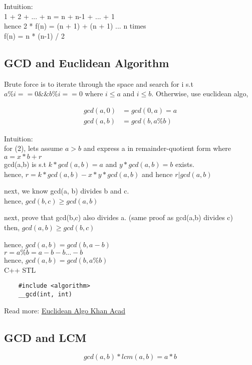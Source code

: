 \documentclass[12pt]{article}
\begin{document}
Intuition: \\ 

1 + 2 + ... + n = n + n-1 + ... + 1 \\
hence 2 * f(n) = (n + 1) + (n + 1) ... n times \\ 
f(n) = n * (n-1) / 2 

\subsection{GCD and Euclidean Algorithm} 

Brute force is to iterate through the space and search for i s.t \(a \% i == 0 \&\& b \% i == 0\) where \(i \leq a\) and \(i \leq b\). Otherwise, use euclidean algo, 

\begin{align}  
	gcd(a, 0) &= gcd(0, a) = a \tag{base case} \\
	gcd(a, b) &= gcd(b, a \% b) \tag{recursive case}
\end{align}

Intuition: \\

for (2), lets assume \(a > b\) and express a in remainder-quotient form where \(a = x * b + r \) \\ 
gcd(a,b) is s.t \(k * gcd(a, b) = a\) and \(y * gcd(a,b) = b\) exists. \\
hence, \(r = k * gcd(a, b) - x* y * gcd(a, b)\) and hence \(r | gcd(a, b)\)

next, we know gcd(a, b) divides b and c. \\
hence, \(gcd(b, c) \geq gcd(a, b) \)

next, prove that gcd(b,c) also divides a. (same proof as gcd(a,b) divides c) \\
then, \(gcd(a,b) \geq gcd(b,c)\) 

hence, \(gcd(a,b) = gcd(b,a - b)\) \\ 
\( r = a \% b = a - b - b ... - b \) \\ 
hence, \(gcd(a,b) = gcd(b, a \% b) \) \\ [\baselineskip] 

C++ STL  
\begin{verbatim}
	#include <algorithm> 
 	__gcd(int, int)
\end{verbatim} 

Read more: \href{https://www.khanacademy.org/computing/computer-science/cryptography/modarithmetic/a/the-euclidean-algorithm}{Euclidean Algo Khan Acad} 

\subsection{GCD and LCM}
\[ gcd(a, b) * lcm(a, b) = a * b \]
\end{document}
